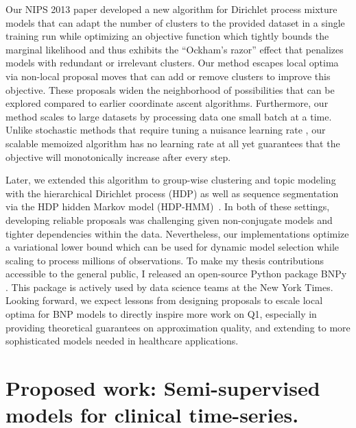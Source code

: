 \documentclass[11pt,letterpaper,sans]{article}
\begin{document}
Our NIPS 2013 paper \cite{hughes:moVB} developed a new algorithm for Dirichlet process mixture models that can adapt the number of clusters to the provided dataset in a single training run while optimizing an objective function which tightly bounds the marginal likelihood and thus exhibits the ``Ockham's razor'' effect that penalizes models with redundant or irrelevant clusters.
Our method escapes local optima via non-local proposal moves that can add or remove clusters to improve this objective. These proposals widen the neighborhood of possibilities that can be explored compared to earlier coordinate ascent algorithms. Furthermore, our method scales to large datasets by processing data one small batch at a time. Unlike stochastic methods that require tuning a nuisance learning rate \cite{hoffman:svi}, our scalable memoized algorithm has no learning rate at all yet guarantees that the objective will monotonically increase after every step.

Later, we extended this algorithm to group-wise clustering and topic modeling with the hierarchical Dirichlet process (HDP) \citep{hughes:hdpreliable} as well as sequence segmentation via the HDP hidden Markov model (HDP-HMM)~\citep{hughes:hdphmm}. In both of these settings, developing reliable proposals was challenging given non-conjugate models and tighter dependencies within the data. Nevertheless, our implementations optimize a variational lower bound which can be used for dynamic model selection while scaling to process millions of observations.
To make my thesis contributions accessible to the general public, I released an open-source Python package BNPy \citep{hughes2016BNPy}. This package is actively used by data science teams at the New York Times.
Looking forward, we expect lessons from designing proposals to escale local optima for BNP models to directly inspire 
more work on Q1, especially in providing theoretical guarantees on approximation quality, and extending to more sophisticated models needed in healthcare applications.



\section{Proposed work: Semi-supervised models for clinical time-series.}
\end{document}

